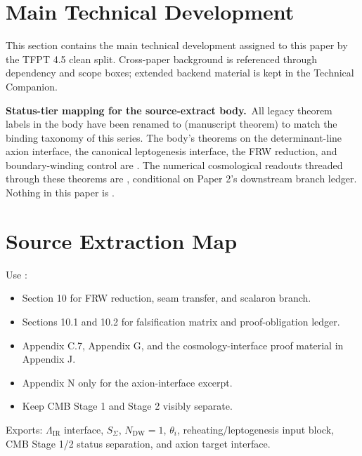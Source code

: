 \clearpage
\section{Main Technical Development}

This section contains the main technical development assigned to this paper by the TFPT 4.5 clean split. Cross-paper background is referenced through dependency and scope boxes; extended backend material is kept in the Technical Companion.

\begin{tfptwarningbox}
\textbf{Status-tier mapping for the source-extract body.}\
All legacy  theorem labels in the body have been
renamed to  (manuscript theorem) to match the binding
taxonomy of this series. The body's theorems on the
determinant-line axion interface, the canonical leptogenesis
interface, the FRW reduction, and boundary-winding control
are . The numerical cosmological readouts threaded
through these theorems are , conditional on Paper 2's
\stag{C} downstream branch ledger. Nothing in this paper is
.
\end{tfptwarningbox}

\tfptDraftXrefNotice



\section{Source Extraction Map}

\begin{tfptsourcebox}
Use \sourceDraft:
\begin{itemize}[leftmargin=1.5em]
    \item Section 10 for FRW reduction, seam transfer, and scalaron branch.
    \item Sections 10.1 and 10.2 for falsification matrix and proof-obligation ledger.
    \item Appendix C.7, Appendix G, and the cosmology-interface proof material in Appendix J.
    \item Appendix N only for the axion-interface excerpt.
    \item Keep CMB Stage 1 and Stage 2 visibly separate.
\end{itemize}
\end{tfptsourcebox}


\begin{tfptexports}
Exports: $\Lambda_{\mathrm{IR}}$ interface, $S_\Sigma$, $N_{\mathrm{DW}}=1$, $\theta_i$, reheating/leptogenesis input block, CMB Stage 1/2 status separation, and axion target interface.
\end{tfptexports}

